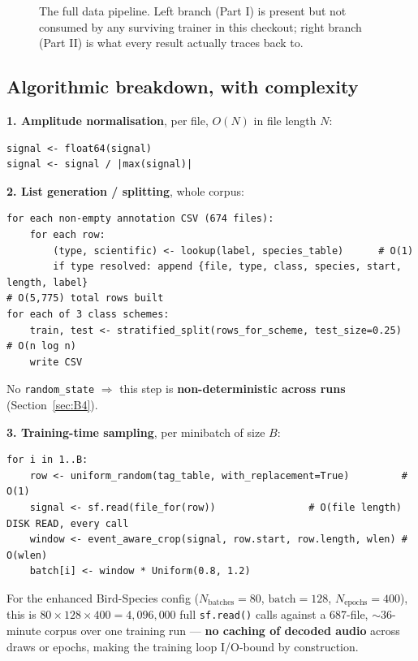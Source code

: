 \documentclass[11pt]{article}
\begin{document}
\begin{figure}[h]
{}
\caption{The full data pipeline. Left branch (Part I) is present but not
consumed by any surviving trainer in this checkout; right branch (Part II)
is what every result actually traces back to.}
\label{fig:pipeline}
\end{figure}

\subsection{Algorithmic breakdown, with complexity}
\label{sec:C2}

\textbf{1. Amplitude normalisation}, per file, $O(N)$ in file length $N$:
\begin{lstlisting}
signal <- float64(signal)
signal <- signal / |max(signal)|
\end{lstlisting}

\textbf{2. List generation / splitting}, whole corpus:
\begin{lstlisting}
for each non-empty annotation CSV (674 files):
    for each row:
        (type, scientific) <- lookup(label, species_table)      # O(1)
        if type resolved: append {file, type, class, species, start, length, label}
# O(5,775) total rows built
for each of 3 class schemes:
    train, test <- stratified_split(rows_for_scheme, test_size=0.25)  # O(n log n)
    write CSV
\end{lstlisting}
No \texttt{random\_state} $\Rightarrow$ this step is \textbf{non-deterministic
across runs} (Section~\ref{sec:B4}).

\textbf{3. Training-time sampling}, per minibatch of size $B$:
\begin{lstlisting}
for i in 1..B:
    row <- uniform_random(tag_table, with_replacement=True)         # O(1)
    signal <- sf.read(file_for(row))                # O(file length) DISK READ, every call
    window <- event_aware_crop(signal, row.start, row.length, wlen) # O(wlen)
    batch[i] <- window * Uniform(0.8, 1.2)
\end{lstlisting}
For the enhanced Bird-Species config ($N_{\text{batches}}=80$,
$\text{batch}=128$, $N_{\text{epochs}}=400$), this is
$80\times128\times400=4{,}096{,}000$ full \texttt{sf.read()} calls against a
687-file, $\sim$36-minute corpus over one training run --- \textbf{no
caching of decoded audio} across draws or epochs, making the training loop
I/O-bound by construction.
\end{document}
